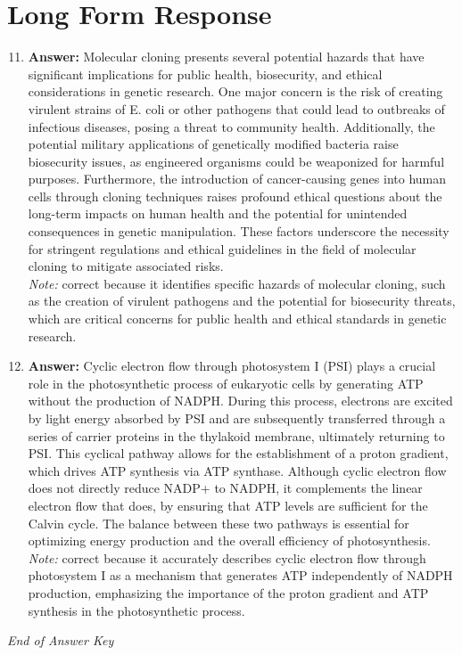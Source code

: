 \documentclass[12pt]{article}
\begin{document}
\section*{Long Form Response}
\begin{enumerate}[label=\arabic*.]
\setcounter{enumi}{10}
\item \textbf{Answer:} Molecular cloning presents several potential hazards that have significant implications for public health, biosecurity, and ethical considerations in genetic research. One major concern is the risk of creating virulent strains of E. coli or other pathogens that could lead to outbreaks of infectious diseases, posing a threat to community health. Additionally, the potential military applications of genetically modified bacteria raise biosecurity issues, as engineered organisms could be weaponized for harmful purposes. Furthermore, the introduction of cancer-causing genes into human cells through cloning techniques raises profound ethical questions about the long-term impacts on human health and the potential for unintended consequences in genetic manipulation. These factors underscore the necessity for stringent regulations and ethical guidelines in the field of molecular cloning to mitigate associated risks.
\\ \textit{Note:} correct because it identifies specific hazards of molecular cloning, such as the creation of virulent pathogens and the potential for biosecurity threats, which are critical concerns for public health and ethical standards in genetic research.
\item \textbf{Answer:} Cyclic electron flow through photosystem I (PSI) plays a crucial role in the photosynthetic process of eukaryotic cells by generating ATP without the production of NADPH. During this process, electrons are excited by light energy absorbed by PSI and are subsequently transferred through a series of carrier proteins in the thylakoid membrane, ultimately returning to PSI. This cyclical pathway allows for the establishment of a proton gradient, which drives ATP synthesis via ATP synthase. Although cyclic electron flow does not directly reduce NADP+ to NADPH, it complements the linear electron flow that does, by ensuring that ATP levels are sufficient for the Calvin cycle. The balance between these two pathways is essential for optimizing energy production and the overall efficiency of photosynthesis.
\\ \textit{Note:} correct because it accurately describes cyclic electron flow through photosystem I as a mechanism that generates ATP independently of NADPH production, emphasizing the importance of the proton gradient and ATP synthesis in the photosynthetic process.
\end{enumerate}

\vfill
\noindent\textit{End of Answer Key}
\end{document}

